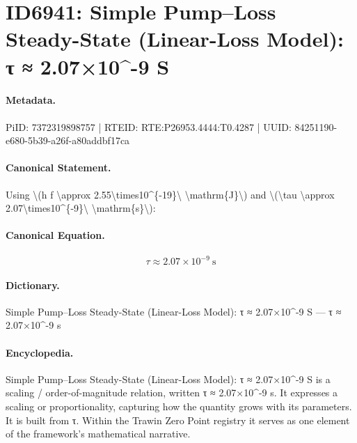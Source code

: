\section*{ID6941: Simple Pump–Loss Steady-State (Linear-Loss Model): τ ≈ 2.07×10\textasciicircum{}-9 S}
\paragraph{Metadata.}
PiID: 7372319898757 | RTEID: RTE:P26953.4444:T0.4287 | UUID: 84251190-e680-5b39-a26f-a80addbf17ca

\paragraph{Canonical Statement.}
Using \textbackslash{}(h f \textbackslash{}approx 2.55\textbackslash{}times10\textasciicircum{}\{-19\}\textbackslash{} \textbackslash{}mathrm\{J\}\textbackslash{}) and \textbackslash{}(\textbackslash{}tau \textbackslash{}approx 2.07\textbackslash{}times10\textasciicircum{}\{-9\}\textbackslash{} \textbackslash{}mathrm\{s\}\textbackslash{}):

\paragraph{Canonical Equation.}
\[
\tau \approx 2.07\times10^{-9}\ \mathrm{s}
\]

\paragraph{Dictionary.}
Simple Pump–Loss Steady-State (Linear-Loss Model): τ ≈ 2.07×10\textasciicircum{}-9 S — τ ≈ 2.07×10\textasciicircum{}-9 s

\paragraph{Encyclopedia.}
Simple Pump–Loss Steady-State (Linear-Loss Model): τ ≈ 2.07×10\textasciicircum{}-9 S is a scaling / order-of-magnitude relation, written τ ≈ 2.07×10\textasciicircum{}-9 s. It expresses a scaling or proportionality, capturing how the quantity grows with its parameters. It is built from τ. Within the Trawin Zero Point registry it serves as one element of the framework's mathematical narrative.
